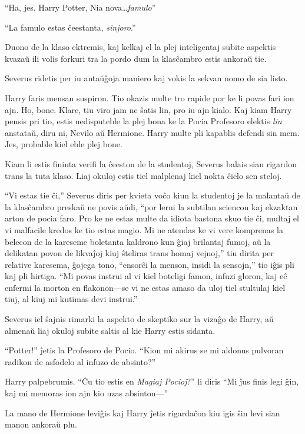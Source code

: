 ``Ha, jes. Harry Potter, Nia nova\ldots \emph{famulo}''

``La famulo estas ĉeestanta, \emph{sinjoro}.''

Duono de la klaso ektremis, kaj kelkaj el la plej inteligentaj subite
aspektis kvazaŭ ili volis forkuri tra la pordo dum la klasĉambro estis
ankoraŭ tie.

Severus ridetis per iu antaŭĝoja maniero kaj vokis la sekvan nomo de
sia listo.

Harry faris mensan suspiron. Tio okazis multe tro rapide por ke li
povas fari ion ajn. Ho, bone. Klare, tiu viro jam ne ŝatis lin, pro iu
ajn kialo. Kaj kiam Harry pensis pri tio, estis nedisputeble la plej
bona ke la Pocia Profesoro elektis \emph{lin} anstataŭ, diru ni,
Nevilo aŭ Hermione. Harry multe pli kapablis defendi sin mem. Jes,
probable kiel eble plej bone.

Kiam li estis fininta verifi la ĉeeston de la studentoj, Severus
balais sian rigardon trans la tuta klaso. Liaj okuloj estis tiel
malplenaj kiel nokta ĉielo sen steloj.

``Vi estas tie ĉi,'' Severus diris per kvieta voĉo kiun la studentoj
je la malantaŭ de la klasĉambro preskaŭ ne povis aŭdi, ``por lerni la
subtilan sciencon kaj ekzaktan arton de pocia faro. Pro ke ne estas
multe da idiota bastona skuo tie ĉi, multaj el vi malfacile kredos ke
tio estas magio. Mi ne atendas ke vi vere komprenas la belecon de la
kareseme boletanta kaldrono kun ĝiaj brilantaj fumoj, aŭ la delikatan
povon de likvaĵoj kiuj ŝteliras trans homaj vejnoj,'' tiu dirita per
relative karesema, ĝojega tono, ``ensorĉi la menson, insidi la
sensojn,'' tio iĝis pli kaj pli hirtiga. ``Mi povas instrui al vi kiel
boteligi famon, infuzi gloron, kaj eĉ enfermi la morton en flakonon—se
vi ne estas amaso da uloj tiel stultulaj kiel tiuj, al kiuj mi kutimas
devi instrui.''

Severus iel ŝajnis rimarki la aspekto de skeptiko sur la vizaĝo de
Harry, aŭ almenaŭ liaj okuloj subite saltis al kie Harry estis
sidanta.

``Potter!'' ĵetis la Profesoro de Pocio. ``Kion mi akirus se mi
aldonus pulvoran radikon de asfodelo al infuzo de absinto?''

Harry palpebrumis. ``Ĉu tio estis en \emph{Magiaj Pocioj}?'' li diris
``Mi ĵus finis legi ĝin, kaj mi memoras ion ajn kio uzas absinton—''

La mano de Hermione leviĝis kaj Harry ĵetis rigardaĉon kiu igis ŝin
levi sian manon ankoraŭ plu.

